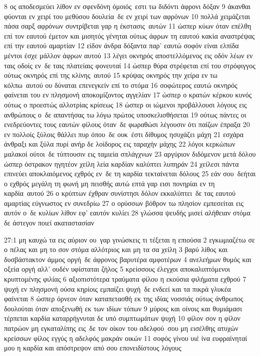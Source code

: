 \documentclass[10pt,oneside,footinclude=true,headinclude=true]{scrbook} %
\begin{document}
8 ος αποδεσμεύει λίθον εν σφενδόνη όμοιός εστι τω διδόντι άφρονι δόξαν
9 άκανθαι φύονται εν χειρί του μεθύσου δουλεία δε εν χειρί των αφρόνων
10 πολλά χειμάζεται πάσα σαρξ αφρόνων συντρίβεται γαρ η έκστασις αυτών
11 ώσπερ κύων όταν επέλθη επί τον εαυτού έμετον και μισητός γένηται ούτως άφρων τη εαυτού κακία αναστρέψας επί την εαυτού αμαρτίαν
12 είδον άνδρα δόξαντα παρ' εαυτώ σοφόν είναι ελπίδα μέντοι έσχε μάλλον άφρων αυτού
13 λέγει οκνηρός αποστελλόμενος εις οδόν λέων εν ταις οδοίς εν δε ταις πλατείαις φονευταί
14 ώσπερ θύρα στρέφεται επί του στρόφιγγος ούτως οκνηρός επί της κλίνης αυτού
15 κρύψας οκνηρός την χείρα εν τω κόλπω αυτού ου δύναται επενεγκείν επί το στόμα
16 σοφώτερος εαυτώ οκνηρός φαίνεται του εν πλησμονή αποκομίζοντος αγγελίαν
17 ώσπερ ο κρατών κέρκου κυνός ούτως ο προεστώς αλλοτρίας κρίσεως
18 ώσπερ οι ιώμενοι προβάλλουσι λόγους εις ανθρώπους ο δε απαντήσας τω λόγω πρώτος υποσκελισθήσεται
19 ούτως πάντες οι ενεδρεύοντες τους εαυτών φίλους όταν δε φωραθώσι λέγουσιν ότι παίζων έπραξα
20 εν πολλοίς ξύλοις θάλλει πυρ όπου δε ουκ έστι δίθυμος ησυχάζει μάχη
21 εσχάρα άνθραξι και ξύλα πυρί ανήρ δε λοίδορος εις ταραχήν μάχης
22 λόγοι κερκώπων μαλακοί ούτοι δε τύπτουσιν εις ταμιεία σπλάγχνων
23 αργύριον διδόμενον μετά δόλου ώσπερ όστρακον ηγητέον χείλη λεία καρδίαν καλύπτει λυπηράν
24 χείλεσι πάντα επινεύει αποκλαιόμενος εχθρός εν δε τη καρδία τεκταίνεται δόλους
25 εάν σου δεήται ο εχθρός μεγάλη τη φωνή μη πεισθής αυτώ επτά γαρ εισι πονηρίαι εν τη καρδία αυτού
26 ο κρύπτων έχθραν συνίστησι δόλον εκκαλύπτει δε τας εαυτού αμαρτίας εύγνωστος εν συνεδρίω
27 ο ορύσσων βόθρον τω πλησίον εμπεσείται εις αυτόν ο δε κυλίων λίθον εφ' εαυτόν κυλίει
28 γλώσσα ψευδής μισεί αλήθειαν στόμα δε άστεγον ποιεί ακαταστασίαν
\par
27:1 μη καυχώ τα εις αύριον ου γαρ γινώσκεις τι τέξεται η επιούσα
2 εγκωμιαζέτω σε ο πέλας και μη το σον στόμα αλλότριος και μη τα σα χείλη
3 βαρύ λίθος και δυσβάστακτον άμμος οργή δε άφρονος βαρυτέρα αμφοτέρων
4 ανελεήμων θυμός και οξεία οργή αλλ' ουδέν υφίσταται ζήλος
5 κρείσσους έλεγχοι αποκαλυπτόμενοι κρυπτομένης φιλίας
6 αξιοπιστότερα τραύματα φίλου η εκούσια φιλήματα εχθρού
7 ψυχή εν πλησμονή ούσα κηρίοις εμπαίζει ψυχή δε ενδεεί και τα πικρά γλυκέα φαίνεται
8 ώσπερ όρνεον όταν καταπετασθή εκ της ιδίας νοσσιάς ούτως άνθρωπος δουλούται όταν αποξενωθή εκ των ιδίων τόπων
9 μύροις και οίνοις και θυμιάμασι τέρπεται καρδία καταρρήγνυται δε υπό συμπτωμάτων ψυχή
10 φίλον σον η φίλον πατρώον μη εγκαταλίπης εις δε τον οίκον του αδελφού σου μη εισέλθης ατυχών κρείσσων φίλος εγγύς η αδελφός μακράν οικών
11 σοφός γίνου υιέ ίνα ευφραίνηταί μου η καρδία και απόστρεψον από σου επονειδίστους λόγους
\end{document}
